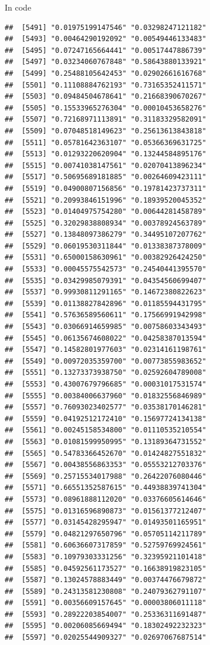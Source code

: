 \documentclass[ignorenonframetext,]{beamer}
\begin{document}
\begin{frame}[fragile]{In code}
\begin{verbatim}
##  [5491] "0.01975199147546" "0.03298247121182"
##  [5493] "0.00464290192092" "0.00549446133483"
##  [5495] "0.07247165664441" "0.00517447886739"
##  [5497] "0.03234060767848" "0.58643880133921"
##  [5499] "0.25488105642453" "0.02902661616768"
##  [5501] "0.11108884762193" "0.73165352411571"
##  [5503] "0.09484504678641" "0.21668390670267"
##  [5505] "0.15533965276304" "0.00010453658276"
##  [5507] "0.72168971113891" "0.31183329582091"
##  [5509] "0.07048518149623" "0.25613613843818"
##  [5511] "0.05781642363107" "0.05366369631725"
##  [5513] "0.01293220620904" "0.13244584895176"
##  [5515] "0.00741038147561" "0.02070413896234"
##  [5517] "0.50695689181885" "0.00264609423111"
##  [5519] "0.04900807156856" "0.19781423737311"
##  [5521] "0.20993846151996" "0.18939520045352"
##  [5523] "0.01404975754280" "0.00644281458789"
##  [5525] "0.32029838808934" "0.00378924563789"
##  [5527] "0.13848097386279" "0.34495107207762"
##  [5529] "0.06019530311844" "0.01338387378009"
##  [5531] "0.65000158630961" "0.00382926424250"
##  [5533] "0.00045575542573" "0.24540441395570"
##  [5535] "0.03429985079391" "0.04354560699407"
##  [5537] "0.99930811291165" "0.14672380822623"
##  [5539] "0.01138827842896" "0.01185594431795"
##  [5541] "0.57636589560611" "0.17566991942998"
##  [5543] "0.03066914659985" "0.00758603343493"
##  [5545] "0.06135674608022" "0.04258387013594"
##  [5547] "0.14582801977603" "0.02314161198761"
##  [5549] "0.00972035359700" "0.00773855983652"
##  [5551] "0.13273373938750" "0.02592604789008"
##  [5553] "0.43007679796685" "0.00031017531574"
##  [5555] "0.00384006637960" "0.01832556846989"
##  [5557] "0.76093023402577" "0.03538170146281"
##  [5559] "0.04192512172410" "0.15697724134138"
##  [5561] "0.00245158534800" "0.01110535210554"
##  [5563] "0.01081599950995" "0.13189364731552"
##  [5565] "0.54783366452670" "0.01424827551832"
##  [5567] "0.00438556863353" "0.05553212703376"
##  [5569] "0.25715534017988" "0.26422076080446"
##  [5571] "0.66551352587615" "0.44938839741304"
##  [5573] "0.08961888112020" "0.03376605614646"
##  [5575] "0.01316596890873" "0.01561377212407"
##  [5577] "0.03145428295947" "0.01493501165951"
##  [5579] "0.04821297650796" "0.05705114211789"
##  [5581] "0.60636607317859" "0.52759769924561"
##  [5583] "0.10979303331256" "0.32395921101418"
##  [5585] "0.04592561173527" "0.16638919823105"
##  [5587] "0.13024578883449" "0.00374476679872"
##  [5589] "0.24313581230808" "0.24079362791107"
##  [5591] "0.00356609157645" "0.00003806011118"
##  [5593] "0.28922203854007" "0.25336311691487"
##  [5595] "0.00206085669494" "0.18302492232323"
##  [5597] "0.02025544909327" "0.02697067687514"

\end{verbatim}
\end{frame}
\end{document}
